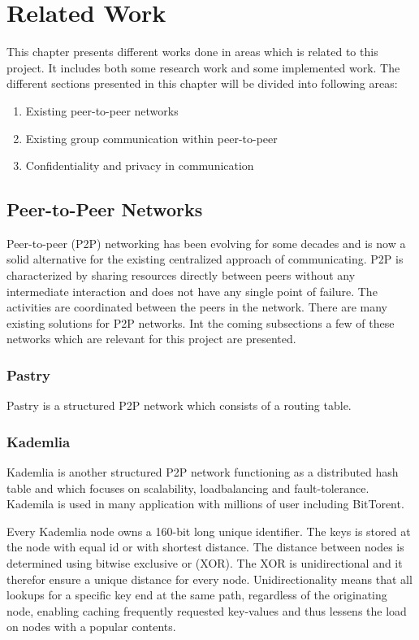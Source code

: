 \chapter{Related Work}
\label{cha:related-work}
This chapter presents different works done in areas which is related to this project. It includes both some research work and some implemented work. 
The different sections presented in this chapter will be divided into following areas:
\begin{enumerate}
	\item Existing peer-to-peer networks
	\item Existing group communication within peer-to-peer  
	\item Confidentiality and privacy in communication
\end{enumerate}

\section{Peer-to-Peer Networks}
Peer-to-peer (P2P) networking has been evolving for some decades and is now a solid alternative for the existing centralized approach of communicating.
P2P is characterized by sharing resources directly between peers without any intermediate interaction and does not have any single point of failure. The activities are coordinated between the peers in the network.
There are many existing solutions for P2P networks. Int the coming subsections a few of these networks which are relevant for this project  are presented. 
\subsection{Pastry}
Pastry is a structured P2P network which consists of a routing table. 

\subsection{Kademlia}
Kademlia is another structured P2P network functioning as a distributed hash table and which focuses on scalability, loadbalancing and fault-tolerance. Kademila is used in many application with millions of user including BitTorent.

Every Kademlia node owns a 160-bit long unique identifier. The keys is stored at the node with equal id or with shortest distance.
The distance between nodes is determined using bitwise exclusive or (XOR). The XOR is unidirectional and it therefor ensure a unique distance for every node. Unidirectionality means that all lookups for a specific key end at the same path, regardless of the originating node, enabling caching frequently requested key-values and thus lessens the load on nodes with a popular contents.


